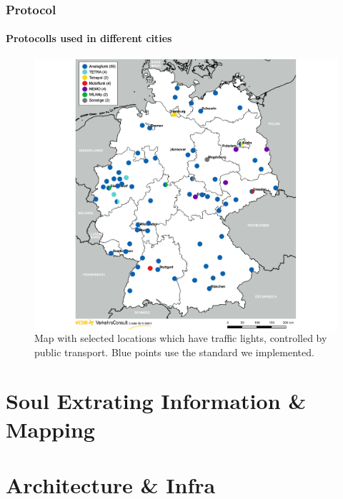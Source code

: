 \documentclass[aspectratio=169]{beamer}
\begin{document}

\begin{frame}
\frametitle{Protocol}
\framesubtitle{Protocolls used in different cities}
\begin{figure}
\centering
\begin{columns}
\includegraphics[height=0.8\textheight]{figs/vcdb-map-ampelbeeinflussung.png}
\caption{Map with selected locations which have traffic lights, controlled by public transport. Blue points use the standard we implemented.}
\end{columns}
\end{figure}
\end{frame}


\section{Soul Extrating Information \& Mapping }




\section{Architecture \& Infra }
\end{document}
